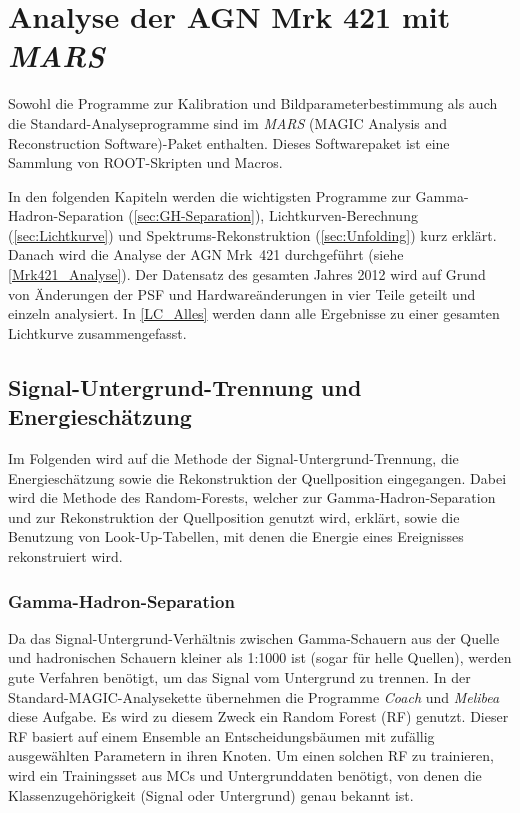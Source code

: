 \chapter{Analyse der AGN Mrk 421 mit \textit{MARS}}
Sowohl die Programme zur Kalibration und Bildparameterbestimmung als auch die Standard-Analyseprogramme sind im \textit{MARS} (MAGIC Analysis and Reconstruction Software)-Paket enthalten.
Dieses Softwarepaket ist eine Sammlung von ROOT-Skripten und Macros.\cite{MARS}

In den folgenden Kapiteln werden die wichtigsten Programme zur Gamma-Hadron-Separation (\autoref{sec:GH-Separation}), Lichtkurven-Berechnung (\autoref{sec:Lichtkurve}) und Spektrums-Rekonstruktion (\autoref{sec:Unfolding}) kurz erklärt.
Danach wird die Analyse der AGN Mrk~421 durchgeführt (siehe \autoref{Mrk421_Analyse}).
Der Datensatz des gesamten Jahres 2012 wird auf Grund von Änderungen der PSF und Hardwareänderungen in vier Teile geteilt und einzeln analysiert. 
In \autoref{LC_Alles} werden dann alle Ergebnisse zu einer gesamten Lichtkurve zusammengefasst.


\section{Signal-Untergrund-Trennung und Energieschätzung}
\label{sec:GH-Separation}
Im Folgenden wird auf die Methode der Signal-Untergrund-Trennung, die Energieschätzung sowie die Rekonstruktion der Quellposition eingegangen.  
Dabei wird die Methode des Random-Forests, welcher zur Gamma-Hadron-Separation und zur Rekonstruktion der Quellposition genutzt wird, erklärt, sowie die Benutzung von Look-Up-Tabellen, mit denen die Energie eines Ereignisses rekonstruiert wird.


\subsection{Gamma-Hadron-Separation}
Da das Signal-Untergrund-Verhältnis zwischen Gamma-Schauern aus der Quelle und hadronischen Schauern kleiner als 1:1000 ist (sogar für helle Quellen), werden gute Verfahren benötigt, um das Signal vom Untergrund zu trennen.
In der Standard-MAGIC-Analysekette übernehmen die Programme \textit{Coach} und \textit{Melibea} diese Aufgabe. 
Es wird zu diesem Zweck ein Random Forest (RF) genutzt. \cite{RandomForestForMAGIC}
Dieser RF basiert auf einem Ensemble an Entscheidungsbäumen mit zufällig ausgewählten Parametern in ihren Knoten.
Um einen solchen RF zu trainieren, wird ein Trainingsset aus MCs und Untergrunddaten benötigt, von denen die Klassenzugehörigkeit (Signal oder Untergrund) genau bekannt ist.


